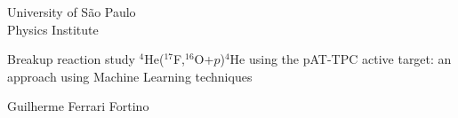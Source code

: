 \documentclass[a4paper,12pt,oneside]{book}
\begin{document}
%
%
%
%


\newpage


\newpage
\thispagestyle{empty}
\begin{center}

	{\fontsize{16}{16} \selectfont University of São Paulo \\}
	\vspace{0.1cm}
	{\fontsize{16}{16} \selectfont Physics Institute}
    \vspace{2.2cm}

	{\fontsize{22}{22}\selectfont Breakup reaction study $^4$He($^{17}$F,$^{16}$O+$p$)$^4$He using the pAT-TPC active target: an approach using Machine Learning techniques\par}
    \vspace{2cm}


    {\fontsize{18}{18}\selectfont Guilherme Ferrari Fortino\par}

    \vspace{1.4cm}

\end{center}
\end{document}
